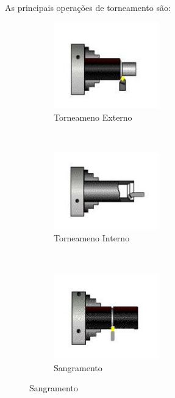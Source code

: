 \documentclass[a4paper,11pt]{article}
\begin{document}
As principais operações de torneamento são:

\begin{figure}[H]
    \centering
    \begin{subfigure}[b]{0.3\textwidth}
        \centering
        \includegraphics[width= 0.5\textwidth]{img/relat1/optornoExt}
        \caption{Torneameno Externo}
    \end{subfigure}
    ~
    \begin{subfigure}[b]{0.3\textwidth}
        \centering
        \includegraphics[width= 0.5\textwidth]{img/relat1/optornoInt}
        \caption{Torneameno Interno}
    \end{subfigure}
    ~
    \begin{subfigure}[b]{0.3\textwidth}
        \centering
        \includegraphics[width= 0.5\textwidth]{img/relat1/optornoSang}
        \caption{Sangramento}
    \end{subfigure}
    

\end{figure}
\end{document}
